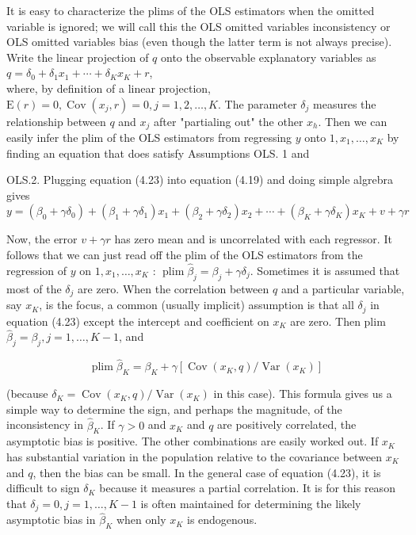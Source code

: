 \documentclass[10pt]{article}
\begin{document}
It is easy to characterize the plims of the OLS estimators when the omitted variable is ignored; we will call this the OLS omitted variables inconsistency or OLS omitted variables bias (even though the latter term is not always precise). Write the linear projection of $q$ onto the observable explanatory variables as\\
$q=\delta_{0}+\delta_{1} x_{1}+\cdots+\delta_{K} x_{K}+r$,\\
where, by definition of a linear projection, $\mathrm{E}(r)=0, \operatorname{Cov}\left(x_{j}, r\right)=0, j=1,2, \ldots, K$. The parameter $\delta_{j}$ measures the relationship between $q$ and $x_{j}$ after "partialing out" the other $x_{h}$. Then we can easily infer the plim of the OLS estimators from regressing $y$ onto $1, x_{1}, \ldots, x_{K}$ by finding an equation that does satisfy Assumptions OLS. 1 and

OLS.2. Plugging equation (4.23) into equation (4.19) and doing simple algrebra gives $y=\left(\beta_{0}+\gamma \delta_{0}\right)+\left(\beta_{1}+\gamma \delta_{1}\right) x_{1}+\left(\beta_{2}+\gamma \delta_{2}\right) x_{2}+\cdots+\left(\beta_{K}+\gamma \delta_{K}\right) x_{K}+v+\gamma r$

Now, the error $v+\gamma r$ has zero mean and is uncorrelated with each regressor. It follows that we can just read off the plim of the OLS estimators from the regression of $y$ on $1, x_{1}, \ldots, x_{K}$ : $\operatorname{plim} \hat{\beta}_{j}=\beta_{j}+\gamma \delta_{j}$. Sometimes it is assumed that most of the $\delta_{j}$ are zero. When the correlation between $q$ and a particular variable, say $x_{K}$, is the focus, a common (usually implicit) assumption is that all $\delta_{j}$ in equation (4.23) except the intercept and coefficient on $x_{K}$ are zero. Then plim $\hat{\beta}_{j}=\beta_{j}, j=1, \ldots, K-1$, and


\begin{equation*}
\operatorname{plim} \hat{\beta}_{K}=\beta_{K}+\gamma\left[\operatorname{Cov}\left(x_{K}, q\right) / \operatorname{Var}\left(x_{K}\right)\right] \tag{4.24}
\end{equation*}


(because $\delta_{K}=\operatorname{Cov}\left(x_{K}, q\right) / \operatorname{Var}\left(x_{K}\right)$ in this case). This formula gives us a simple way to determine the sign, and perhaps the magnitude, of the inconsistency in $\hat{\beta}_{K}$. If $\gamma>0$ and $x_{K}$ and $q$ are positively correlated, the asymptotic bias is positive. The other combinations are easily worked out. If $x_{K}$ has substantial variation in the population relative to the covariance between $x_{K}$ and $q$, then the bias can be small. In the general case of equation (4.23), it is difficult to sign $\delta_{K}$ because it measures a partial correlation. It is for this reason that $\delta_{j}=0, j=1, \ldots, K-1$ is often maintained for determining the likely asymptotic bias in $\hat{\beta}_{K}$ when only $x_{K}$ is endogenous.
\end{document}

